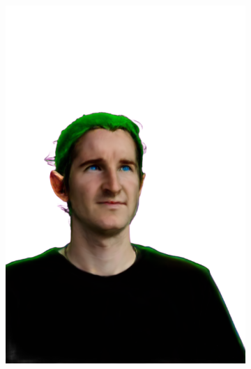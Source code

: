 \begin{figure}[ht]
\begin{subfigure}{0.08\linewidth}
        \includegraphics[width=\textwidth]{Figures/results/low/ephra_elf/11_render.png}

\end{subfigure}
\end{figure}
